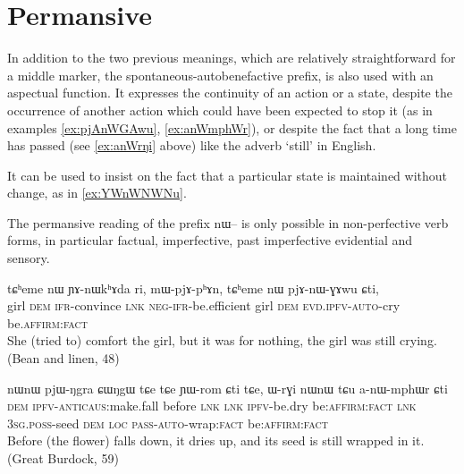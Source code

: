 \documentclass[oldfontcommands,oneside,a4paper,11pt]{article}
\newcommand{\ipa}[1]{{\phon \mbox{#1}}} %
\begin{document}
\section{Permansive}
In addition to the two previous meanings, which are relatively straightforward for a middle marker, the spontaneous-autobenefactive prefix, is also used with an aspectual function. It expresses the continuity of an action or a state, despite the occurrence of another action which could have been expected to stop it (as in examples \ref{ex:pjAnWGAwu}, \ref{ex:anWmphWr}), or despite the fact that a long time has passed (see \ref{ex:anWrŋi} above) like the adverb `still' in English. 

It can be used to insist on the fact  that a particular state is maintained without change, as in \ref{ex:YWnWNWNu}.

The permansive reading of the prefix \ipa{nɯ--} is only possible in non-perfective verb forms, in particular factual, imperfective, past imperfective evidential and sensory.


\begin{exe}
\ex \label{ex:pjAnWGAwu}
\gll
\ipa{tɕʰeme} 	\ipa{nɯ} 	\ipa{ɲɤ-nɯkʰɤda} 	\ipa{ri,} 	\ipa{mɯ-pjɤ-pʰɤn,} 	\ipa{tɕʰeme} 	\ipa{nɯ} 	\ipa{pjɤ-nɯ-ɣɤwu} 	\ipa{ɕti,} \\
girl \textsc{dem} \textsc{ifr}-convince \textsc{lnk} \textsc{neg-ifr}-be.efficient girl \textsc{dem} \textsc{evd.ipfv-auto}-cry  be.\textsc{affirm:fact} \\
\glt She (tried to) comfort the girl, but it was for nothing, the girl was still crying. (Bean and linen, 48)
\end{exe} 

\begin{exe}
\ex \label{ex:anWmphWr}
\gll
\ipa{nɯnɯ} 	\ipa{pjɯ-ŋgra} 	\ipa{ɕɯŋgɯ} 	\ipa{tɕe} 	\ipa{tɕe} 	\ipa{ɲɯ-rom} 	\ipa{ɕti} 	\ipa{tɕe,} 	\ipa{ɯ-rɣi} 	\ipa{nɯnɯ} 	\ipa{tɕu} 	\ipa{a-nɯ-mphɯr} 	\ipa{ɕti} \\
\textsc{dem} \textsc{ipfv-anticaus}:make.fall before \textsc{lnk}  \textsc{lnk} \textsc{ipfv}-be.dry be\textsc{:affirm:fact} \textsc{lnk} \textsc{3sg.poss}-seed \textsc{dem} \textsc{loc} \textsc{pass-auto}-wrap:\textsc{fact} be\textsc{:affirm:fact} \\
\glt Before (the flower) falls down, it dries up, and its seed is still wrapped in it. (Great Burdock, 59)
\end{exe} 
\end{document}
